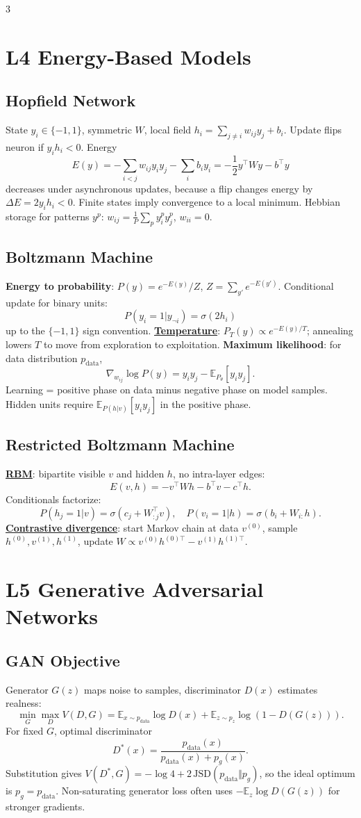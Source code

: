 \documentclass{article}
\newcommand{\key}[1]{\textbf{#1}}
\newcommand{\lowterm}[1]{\textbf{\underline{#1}}}
\newcommand{\E}{\mathbb{E}}
\begin{document}
\begin{multicols*}{3}
\section{L4 Energy-Based Models}
\subsection{Hopfield Network}
State $y_i\in\{-1,1\}$, symmetric $W$, local field $h_i=\sum_{j\ne i}w_{ij}y_j+b_i$. Update flips neuron if $y_i h_i<0$. Energy
\[
E(y)=-\sum_{i<j}w_{ij}y_iy_j-\sum_i b_iy_i
=-\frac12y^\top Wy-b^\top y
\]
decreases under asynchronous updates, because a flip changes energy by $\Delta E=2y_i h_i<0$. Finite states imply convergence to a local minimum. Hebbian storage for patterns $y^p$: $w_{ij}=\frac{1}{P}\sum_p y_i^py_j^p$, $w_{ii}=0$.

\subsection{Boltzmann Machine}
\key{Energy to probability}: $P(y)=e^{-E(y)}/Z$, $Z=\sum_{y'}e^{-E(y')}$. Conditional update for binary units:
\[
P(y_i=1|y_{\neg i})=\sigma(2h_i)
\]
up to the $\{-1,1\}$ sign convention. \lowterm{Temperature}: $P_T(y)\propto e^{-E(y)/T}$; annealing lowers $T$ to move from exploration to exploitation.
\key{Maximum likelihood}: for data distribution $p_{\text{data}}$,
\[
\nabla_{w_{ij}}\log P(y)=y_iy_j-\E_{P_\theta}[y_iy_j].
\]
Learning = positive phase on data minus negative phase on model samples. Hidden units require $\E_{P(h|v)}[y_iy_j]$ in the positive phase.

\subsection{Restricted Boltzmann Machine}
\lowterm{RBM}: bipartite visible $v$ and hidden $h$, no intra-layer edges:
\[
E(v,h)=-v^\top Wh-b^\top v-c^\top h.
\]
Conditionals factorize:
\[
P(h_j=1|v)=\sigma(c_j+W_{:j}^\top v),\quad
P(v_i=1|h)=\sigma(b_i+W_{i:}h).
\]
\lowterm{Contrastive divergence}: start Markov chain at data $v^{(0)}$, sample $h^{(0)},v^{(1)},h^{(1)}$, update $W\propto v^{(0)}h^{(0)\top}-v^{(1)}h^{(1)\top}$.

\section{L5 Generative Adversarial Networks}
\subsection{GAN Objective}
Generator $G(z)$ maps noise to samples, discriminator $D(x)$ estimates realness:
\[
\min_G\max_D V(D,G)=\E_{x\sim p_{\text{data}}}\log D(x)+\E_{z\sim p_z}\log(1-D(G(z))).
\]
For fixed $G$, optimal discriminator
\[
D^*(x)=\frac{p_{\text{data}}(x)}{p_{\text{data}}(x)+p_g(x)}.
\]
Substitution gives $V(D^*,G)=-\log4+2\,\mathrm{JSD}(p_{\text{data}}\Vert p_g)$, so the ideal optimum is $p_g=p_{\text{data}}$. Non-saturating generator loss often uses $-\E_z\log D(G(z))$ for stronger gradients.


\end{multicols*}
\end{document}
